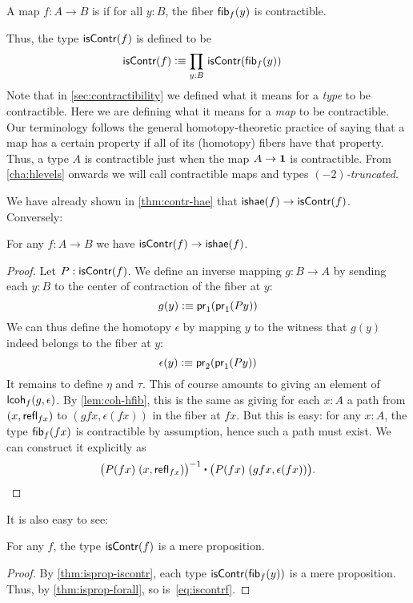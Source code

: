 \begin{defn} \label{defn:equivalence}
  A map $f:A\to B$ is 
  if for all $y:B$, the fiber ${\mathsf{fib}}_{f}(y)$ is contractible.
\end{defn}

Thus, the type $\mathsf{isContr}(f)$ is defined to be
\begin{align}
  \iscontr(f) &\defeq \prd{y:B} \iscontr(\hfib f y)\label{eq:iscontrf}
\end{align}
Note that in \autoref{sec:contractibility} we defined what it means for a \emph{type} to be contractible.
Here we are defining what it means for a \emph{map} to be contractible.
Our terminology follows the general homotopy-theoretic practice of saying that a map has a certain property if all of its (homotopy) fibers have that property.
Thus, a type $A$ is contractible just when the map $A\to\mathbf{1}$ is contractible.
From \autoref{cha:hlevels} onwards we will call contractible maps and types \emph{$(-2)$-truncated}.

We have already shown in \autoref{thm:contr-hae} that $\mathsf{ishae}(f) \to \mathsf{isContr}(f)$.
Conversely:

\begin{thm}\label{thm:lequiv-contr-hae}
For any $f:A\to B$ we have ${\mathsf{isContr}(f)} \to {\ensuremath{\mathsf{ishae}}(f)}$.
\end{thm}
\begin{proof}
Let $P : \mathsf{isContr}(f)$. We define an inverse mapping $g : B \to A$ by sending each $y : B$ to the center of contraction of the fiber at $y$:
\[ g(y) \vcentcolon\equiv \mathsf{pr}_{1}(\mathsf{pr}_{1}(Py)) \]
We can thus define the homotopy $\epsilon$ by mapping $y$ to the witness that $g(y)$ indeed belongs to the fiber at $y$:
\[ \epsilon(y) \vcentcolon\equiv \mathsf{pr}_{2}(\mathsf{pr}_{1}(P y)) \]
It remains to define $\eta$ and $\tau$. This of course amounts to giving an element of $\mathsf{lcoh}_{f}(g,\epsilon)$. By \autoref{lem:coh-hfib}, this is the same as giving for each $x:A$ a path from $(x,\mathsf{refl}_{fx})$ to $(gfx,\epsilon(fx))$ in the fiber at $fx$. But this is easy: for any $x : A$, the type ${\mathsf{fib}}_{f}(fx)$ 
is contractible by assumption, hence such a path must exist. We can construct it explicitly as
\[\opp{\big(P(fx) \; (x,\refl{fx})\big)} \ct \big(P(fx) \; (gfx,\epsilon(fx))\big). \qedhere \]
\end{proof}

It is also easy to see:

\begin{lem}\label{thm:contr-hprop}
  For any $f$, the type $\mathsf{isContr}(f)$ is a mere proposition.
\end{lem}
\begin{proof}
  By \autoref{thm:isprop-iscontr}, each type $\mathsf{isContr} ({\mathsf{fib}}_{f}(y))$ is a mere proposition.
  Thus, by \autoref{thm:isprop-forall}, so is~\eqref{eq:iscontrf}.
\end{proof}

